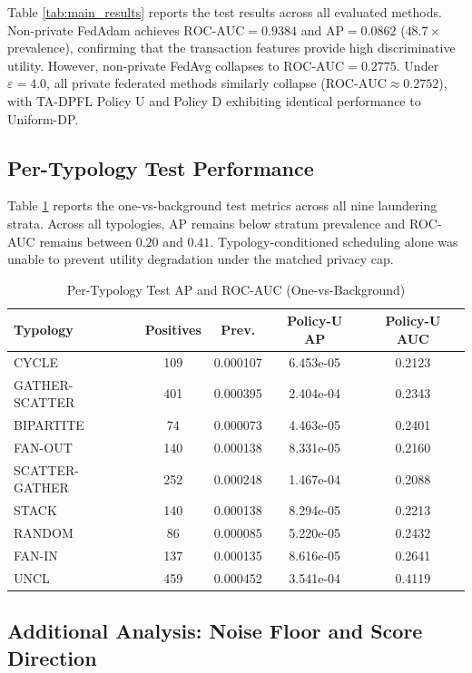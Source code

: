 \documentclass[conference]{IEEEtran}
\begin{document}
Table \ref{tab:main_results} reports the test results across all evaluated methods. Non-private FedAdam achieves $\text{ROC-AUC} = 0.9384$ and $\text{AP} = 0.0862$ ($48.7\times$ prevalence), confirming that the transaction features provide high discriminative utility. However, non-private FedAvg collapses to $\text{ROC-AUC} = 0.2775$. Under $\varepsilon = 4.0$, all private federated methods similarly collapse ($\text{ROC-AUC} \approx 0.2752$), with TA-DPFL Policy U and Policy D exhibiting identical performance to Uniform-DP.

\subsection{Per-Typology Test Performance}
Table \ref{tab:typology_results} reports the one-vs-background test metrics across all nine laundering strata. Across all typologies, AP remains below stratum prevalence and ROC-AUC remains between $0.20$ and $0.41$. Typology-conditioned scheduling alone was unable to prevent utility degradation under the matched privacy cap.

\begin{table}[h]
\centering
\caption{Per-Typology Test AP and ROC-AUC (One-vs-Background)}
\label{tab:typology_results}
\begin{tabular}{lcccc}
\toprule
\textbf{Typology} & \textbf{Positives} & \textbf{Prev.} & \textbf{Policy-U AP} & \textbf{Policy-U AUC} \\
\midrule
CYCLE & 109 & 0.000107 & 6.453e-05 & 0.2123 \\
GATHER-SCATTER & 401 & 0.000395 & 2.404e-04 & 0.2343 \\
BIPARTITE & 74 & 0.000073 & 4.463e-05 & 0.2401 \\
FAN-OUT & 140 & 0.000138 & 8.331e-05 & 0.2160 \\
SCATTER-GATHER & 252 & 0.000248 & 1.467e-04 & 0.2088 \\
STACK & 140 & 0.000138 & 8.294e-05 & 0.2213 \\
RANDOM & 86 & 0.000085 & 5.220e-05 & 0.2432 \\
FAN-IN & 137 & 0.000135 & 8.616e-05 & 0.2641 \\
UNCL & 459 & 0.000452 & 3.541e-04 & 0.4119 \\
\bottomrule
\end{tabular}
\end{table}

\subsection{Additional Analysis: Noise Floor and Score Direction}
\end{document}
